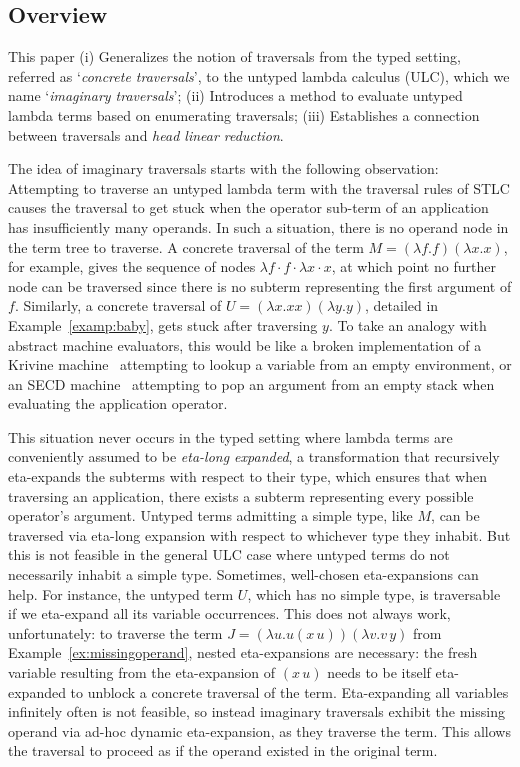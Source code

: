 \documentclass{elsarticle}
\theoremstyle{plain}
\theoremstyle{definition}
\begin{document}
\subsection{Overview}
This paper
(i) Generalizes the notion of traversals from the typed setting, referred as `\emph{concrete traversals}', to the untyped lambda calculus (ULC), which we name `\emph{imaginary traversals}';
(ii) Introduces a method to evaluate untyped lambda terms based on enumerating traversals;
(iii) Establishes a connection between traversals and \emph{head linear reduction}.

The idea of imaginary traversals starts with the following observation:
Attempting to traverse an untyped lambda term with the
traversal rules of STLC causes the traversal to get stuck when the operator sub-term of an application has insufficiently many operands. In such a situation, there is no operand node in the term tree to traverse.
A concrete traversal of the term $M = (\lambda f.f)(\lambda x.x)$, for example,  gives the sequence of nodes $\lambda f \cdot f \cdot \lambda x \cdot x$, at which point no further node can be traversed since there is no subterm representing the first argument of $f$.
Similarly, a concrete traversal of $U = (\lambda x. x x)(\lambda y. y)$,
detailed in Example~\ref{examp:baby}, gets stuck after traversing $y$. To take an analogy with abstract machine evaluators, this would be like a broken implementation of a Krivine machine~\cite{Krivine2007} attempting to lookup a variable from an empty environment, or an SECD machine~\cite{landin-secd} attempting to pop an argument from an empty stack when evaluating the application operator.

This situation never occurs in the typed setting where lambda terms are
conveniently assumed to be \emph{eta-long expanded}, a transformation that recursively eta-expands the subterms with respect to their type,
which ensures that when traversing an application, there exists a subterm representing every possible operator's argument.
%
Untyped terms admitting a simple type, like $M$, can be traversed via eta-long expansion with respect to whichever type they inhabit.
But this is not feasible in the general ULC case where untyped terms do not necessarily inhabit a simple type.
Sometimes, well-chosen eta-expansions can help. For instance, the untyped term $U$, which has no simple type, is traversable if we eta-expand all its variable occurrences. This does not always work, unfortunately: to traverse the
term $J = (\lambda u . u(x\, u)) (\lambda v . v\, y)$ from
 Example~\ref{ex:missingoperand}, nested eta-expansions are necessary:
 the fresh variable resulting from the eta-expansion of $(x\, u)$ needs to be itself eta-expanded to unblock a concrete traversal of the term.
 Eta-expanding all variables infinitely often is not feasible, so instead imaginary traversals exhibit the missing operand via ad-hoc dynamic eta-expansion, as they traverse the term.
 This allows the traversal to proceed as if the operand existed in the original term.
\end{document}

